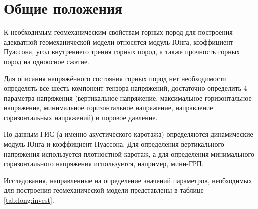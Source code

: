 \chapter{Общие положения} \label{ch1}


К необходимым геомеханическим свойствам горных пород для построения адекватной геомеханической модели относятся модуль Юнга, коэффициент Пуассона, угол внутреннего трения горных пород, а также прочность горных пород на одноосное сжатие.

Для описания напряжённого состояния горных пород нет необходимости определять все шесть компонент тензора напряжений, достаточно определить 4 параметра напряжения (вертикальное напряжение, максимальное горизонтальное напряжение, минимальное горизонтальное напряжение, направление горизонтальных напряжений) и поровое давление.

По данным ГИС (а именно акустического каротажа) определяются динамические модуль Юнга и коэффициент Пуассона.
Для определения вертикального напряжения используется плотностной каротаж, а для определения минимального горизонтального напряжения используется, например, мини-ГРП.

Исследования, направленные на определение значений параметров, необходимых для построения геомеханической модели представлены в таблице \ref{tab:long:invest}.

